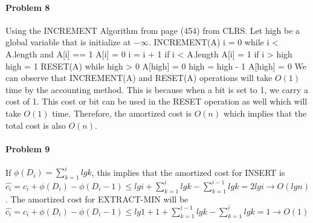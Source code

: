 \documentclass[11pt]{article}
\begin{document}
\paragraph{\noindent\textbf{\LARGE{Problem 8}}}
\begin{flushleft}
    Using the INCREMENT Algorithm from page (454) from CLRS.
    \newline
    \newline
    Let high be a global variable that is initialize at $-\infty$.
    \newline
    \newline
    INCREMENT(A) \newline \null
        \quad i = 0 \newline \null
        \quad while i < A.length and A[i] == 1 \newline \null
            \quad \quad A[i] = 0 \newline \null
            \quad \quad i = i + 1 \newline \null
        \quad if i < A.length \newline \null
            \quad \quad A[i] = 1 \newline \null
            \quad \quad if i > high \newline \null
                \quad \quad \quad high = 1
    \newline
    \newline
    RESET(A) \newline \null
        \quad while high > 0 \newline \null
            \quad \quad A[high] = 0 \newline \null
            \quad \quad high = high - 1 \newline \null
        \quad A[high] = 0
    \newline
    \newline
    We can observe that INCREMENT(A) and RESET(A) operations will take $O(1)$ time by the accounting method.
    This is because when a bit is set to 1, we carry a cost of 1. This cost or bit can be used in the RESET operation as well which will take $O(1)$ time.
    \newline
    \newline
    Therefore, the amortized cost is $O(n)$ which implies that the total cost is also $O(n)$.
\end{flushleft}
\paragraph{\noindent\textbf{\LARGE{Problem 9}}}
\begin{flushleft}
    If $\phi(D_i)  = \sum_{k = 1}^i lg k$, this implies that the amortized cost for INSERT is 
    $\hat{c_i} = c_i + \phi(D_i) - \phi(D_i - 1) \leq lg i + \sum_{k=1}^i lg k - \sum_{k=1}^{i-1}lg k = 2 lg i \rightarrow O(lgn)$.
    \newline
    \newline
    The amortized cost for EXTRACT-MIN will be 
    $\hat{c_i} = c_i + \phi(D_i) - \phi (D_i -1) \leq lg 1 + 1 + \sum_{k=1}^{i-1} lg k - \sum_{k=1}^i lg k = 1 \rightarrow O(1)$
\end{flushleft}
\end{document}
